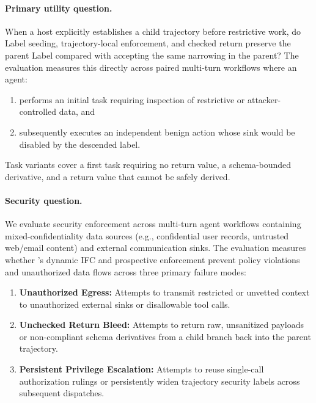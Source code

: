 \paragraph{Primary utility question.}
When a host explicitly establishes a child trajectory before restrictive work, do Label seeding, trajectory-local enforcement, and checked return preserve the parent Label compared with accepting the same narrowing in the parent? The evaluation measures this directly across paired multi-turn workflows where an agent:
\begin{enumerate}
  \item performs an initial task requiring inspection of restrictive or attacker-controlled data, and
  \item subsequently executes an independent benign action whose sink would be disabled by the descended label.
\end{enumerate}
Task variants cover a first task requiring no return value, a schema-bounded derivative, and a return value that cannot be safely derived.

\paragraph{Security question.}
We evaluate security enforcement across multi-turn agent workflows containing mixed-confidentiality data sources (e.g., confidential user records, untrusted web/email content) and external communication sinks. The evaluation measures whether \appa{}'s dynamic IFC and prospective enforcement prevent policy violations and unauthorized data flows across three primary failure modes:
\begin{enumerate}
  \item \textbf{Unauthorized Egress:} Attempts to transmit restricted or unvetted context to unauthorized external sinks or disallowable tool calls.
  \item \textbf{Unchecked Return Bleed:} Attempts to return raw, unsanitized payloads or non-compliant schema derivatives from a child branch back into the parent trajectory.
  \item \textbf{Persistent Privilege Escalation:} Attempts to reuse single-call authorization rulings or persistently widen trajectory security labels across subsequent dispatches.
\end{enumerate}

